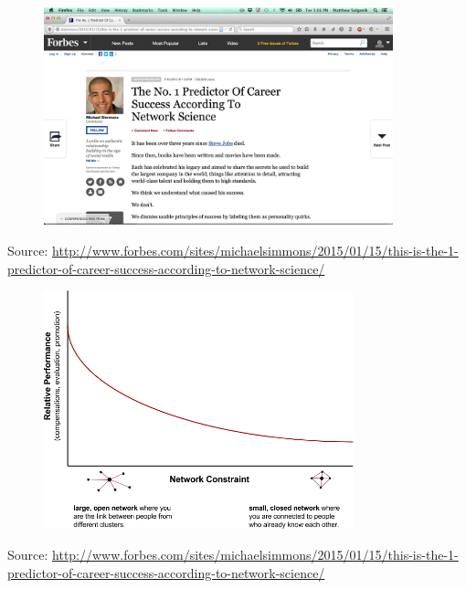 \documentclass[aspectratio=169]{beamer}
\begin{document}
\begin{frame}

\begin{figure}
  \centering
  \includegraphics[width=0.9\textwidth]{figures/simmons_predictor_2015}
\end{figure}

\tiny{Source: \url{http://www.forbes.com/sites/michaelsimmons/2015/01/15/this-is-the-1-predictor-of-career-success-according-to-network-science/}}


\end{frame}
\begin{frame}

\begin{figure}
  \centering
  \includegraphics[width=0.8\textwidth]{figures/Burt_Success_Final.png}
\end{figure}

\tiny{Source: \url{http://www.forbes.com/sites/michaelsimmons/2015/01/15/this-is-the-1-predictor-of-career-success-according-to-network-science/}}


\end{frame}
\end{document}
